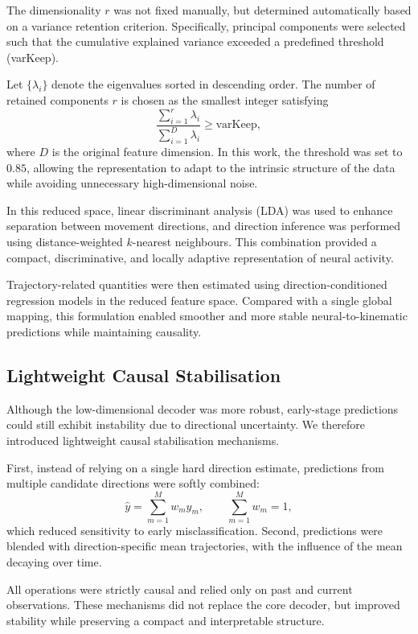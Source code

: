 The dimensionality $r$ was not fixed manually, but determined automatically based on a variance retention criterion. Specifically, principal components were selected such that the cumulative explained variance exceeded a predefined threshold (varKeep). 

Let $\{\lambda_i\}$ denote the eigenvalues sorted in descending order. The number of retained components $r$ is chosen as the smallest integer satisfying
\begin{equation}
\frac{\sum_{i=1}^{r} \lambda_i}{\sum_{i=1}^{D} \lambda_i} \geq \text{varKeep},
\end{equation}
where $D$ is the original feature dimension. In this work, the threshold was set to $0.85$, allowing the representation to adapt to the intrinsic structure of the data while avoiding unnecessary high-dimensional noise.


In this reduced space, linear discriminant analysis (LDA) was used to enhance separation between movement directions, and direction inference was performed using distance-weighted $k$-nearest neighbours. This combination provided a compact, discriminative, and locally adaptive representation of neural activity.

Trajectory-related quantities were then estimated using direction-conditioned regression models in the reduced feature space. Compared with a single global mapping, this formulation enabled smoother and more stable neural-to-kinematic predictions while maintaining causality.

\subsection{Lightweight Causal Stabilisation}

Although the low-dimensional decoder was more robust, early-stage predictions could still exhibit instability due to directional uncertainty. We therefore introduced lightweight causal stabilisation mechanisms.

First, instead of relying on a single hard direction estimate, predictions from multiple candidate directions were softly combined:
\begin{equation}
\hat{y}=\sum_{m=1}^{M} w_m \hat{y}_m, \qquad \sum_{m=1}^{M} w_m = 1,
\label{eq:ensemble}
\end{equation}
which reduced sensitivity to early misclassification. Second, predictions were blended with direction-specific mean trajectories, with the influence of the mean decaying over time. 

All operations were strictly causal and relied only on past and current observations. These mechanisms did not replace the core decoder, but improved stability while preserving a compact and interpretable structure.